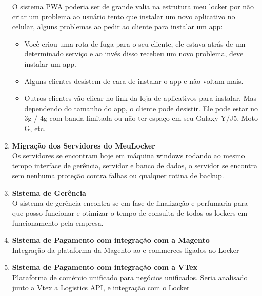 \documentclass[
	12pt,				%
	openright,			%
	twoside,			%
	a4paper,			%
	english,			%
	french,				%
	spanish,			%
	brazil,				%
	]{abntex2}
\begin{document}
\begin{enumerate}
			O sistema PWA poderia ser de grande valia na estrutura meu locker por não criar um problema ao usuário tento que instalar um novo aplicativo no celular, alguns problemas ao pedir ao cliente para instalar um app:
			\begin{itemize}
			\item Você criou uma rota de fuga para o seu cliente, ele estava atrás de um determinado serviço e ao invés disso recebeu um novo problema, deve instalar um app.
			\item Alguns clientes desistem de cara de instalar o app e não voltam mais.
			\item Outros clientes vão clicar no link da loja de aplicativos para instalar. Mas dependendo do tamanho do app, o cliente pode desistir. Ele pode estar no 3g / 4g com banda limitada ou não ter espaço em seu Galaxy Y/J5, Moto G, etc.
			\end{itemize}
		\item \textbf{Migração dos Servidores do MeuLocker} \\
			Os servidores se encontram hoje em máquina windows rodando ao mesmo tempo interface de gerência, servidor e banco de dados, o servidor se encontra sem nenhuma proteção contra falhas ou qualquer rotina de backup.
		\item \textbf{Sistema de Gerência} \\
			O sistema de gerência encontra-se em fase de finalização e perfumaria para que posso funcionar e otimizar o tempo de consulta de todos os lockers em funcionamento pela empresa.
		\item \textbf{Sistema de Pagamento com integração com a Magento} \\
			Integração da plataforma da Magento ao e-commerces ligados ao Locker
		\item \textbf{Sistema de Pagamento com integração com a VTex} \\
			Plataforma de comércio unificado para negócios unificados.
			Seria analisado junto a Vtex a Logistics API, e integração com o Locker
	
		
	\end{enumerate}
	
\end{document}

